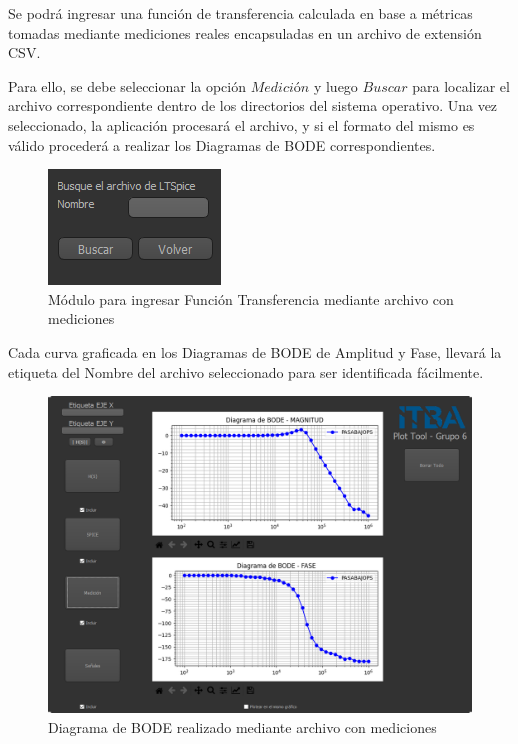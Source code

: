Se podrá ingresar una función de transferencia calculada en base a métricas tomadas mediante mediciones reales encapsuladas en un archivo de extensión CSV.

Para ello, se debe seleccionar la opción $Medición$ y luego $Buscar$ para localizar el archivo correspondiente dentro de los directorios del sistema operativo. 
Una vez seleccionado, la aplicación procesará el archivo, y si el formato del mismo es válido procederá a realizar los Diagramas de BODE correspondientes.

\begin{figure}[!htb] 
    \centering 
    \includegraphics [scale=0.8]{../EJ2/LatexScreenshots/plotToolSpiceFunctionInput.png} 
    \caption{Módulo para ingresar Función Transferencia mediante archivo con mediciones}
    \label{fig:csvFunctionInputPlotTool}
\end{figure}

Cada curva graficada en los Diagramas de BODE de Amplitud y Fase, llevará la etiqueta del Nombre del archivo seleccionado para ser identificada fácilmente.

\begin{figure}[!htb] 
    \centering 
    \includegraphics [width=0.8
    \textwidth] {../EJ2/LatexScreenshots/plotToolMedicion.png} 
    \caption{Diagrama de BODE realizado mediante archivo con mediciones}
    \label{fig:csvFunctionPlotTool}
\end{figure}

